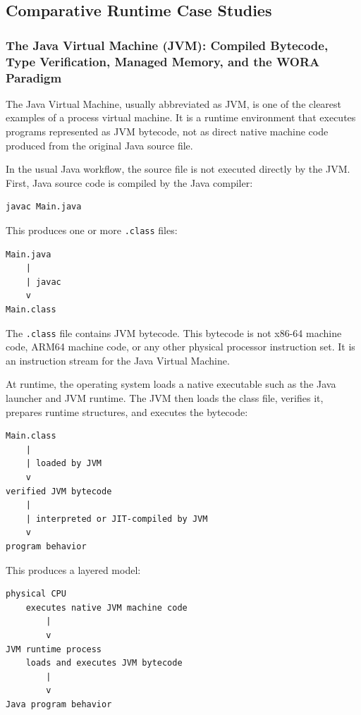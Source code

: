 \subsection{Comparative Runtime Case Studies}



\subsubsection{The Java Virtual Machine (JVM): Compiled Bytecode, Type Verification, Managed Memory, and the WORA Paradigm}

The Java Virtual Machine, usually abbreviated as JVM, is one of the clearest examples of a process virtual machine. It is a runtime environment that executes programs represented as JVM bytecode, not as direct native machine code produced from the original Java source file.

In the usual Java workflow, the source file is not executed directly by the JVM. First, Java source code is compiled by the Java compiler:

\begin{verbatim}
javac Main.java
\end{verbatim}

This produces one or more \texttt{.class} files:

\begin{verbatim}
Main.java
    |
    | javac
    v
Main.class
\end{verbatim}

The \texttt{.class} file contains JVM bytecode. This bytecode is not x86-64 machine code, ARM64 machine code, or any other physical processor instruction set. It is an instruction stream for the Java Virtual Machine.

At runtime, the operating system loads a native executable such as the Java launcher and JVM runtime. The JVM then loads the class file, verifies it, prepares runtime structures, and executes the bytecode:

\begin{verbatim}
Main.class
    |
    | loaded by JVM
    v
verified JVM bytecode
    |
    | interpreted or JIT-compiled by JVM
    v
program behavior
\end{verbatim}

This produces a layered model:

\begin{verbatim}
physical CPU
    executes native JVM machine code
        |
        v
JVM runtime process
    loads and executes JVM bytecode
        |
        v
Java program behavior
\end{verbatim}

